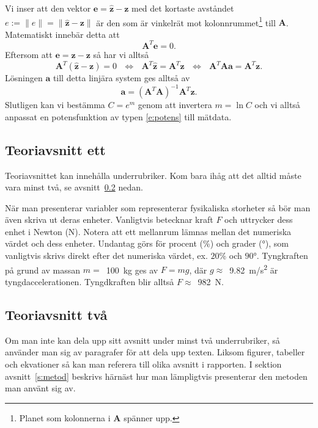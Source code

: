 \documentclass[a4paper]{article}
\begin{document}
Vi inser att den vektor $\mathbf{e}=\mathbf{\hat{z}}-\mathbf{z}$ med det kortaste avståndet $e:=\|e\|=\|\mathbf{\hat{z}}-\mathbf{z}\|$ är den som är vinkelrät mot kolonnrummet\footnote{Planet som kolonnerna i $\mathbf{A}$ spänner upp.} till $\mathbf{A}$. Matematiskt innebär detta att
%
\begin{equation}\label{e:ATe}
    \mathbf{A}^{T}\mathbf{e}=0.
\end{equation}
%
Eftersom att $\mathbf{e}=\mathbf{\hat{z}}-\mathbf{z}$ så har vi alltså
%
\begin{equation}\label{e:ATe1}
    \mathbf{A}^{T}\left(\mathbf{\hat{z}}-\mathbf{z}\right)=0
    ~~~ \Longleftrightarrow ~~~
    \mathbf{A}^{T}\mathbf{\hat{z}}=\mathbf{A}^{T}\mathbf{z}
    ~~~ \Longleftrightarrow ~~~
    \mathbf{A}^{T}\mathbf{A}\mathbf{a}=\mathbf{A}^{T}\mathbf{z}.
\end{equation}
%
Lösningen $\mathbf{a}$ till detta linjära system ges alltså av
%
\begin{equation}\label{e:a}
    \mathbf{a}=\left(\mathbf{A}^{T}\mathbf{A}\right)^{-1}\mathbf{A}^{T}\mathbf{z}.
\end{equation}
%
Slutligen kan vi bestämma $C=e^m$ genom att invertera $m=\ln C$ och vi alltså anpassat en potensfunktion av typen \eqref{e:potens} till mätdata.

\subsection{Teoriavsnitt ett}
Teoriavsnittet kan innehålla underrubriker. Kom bara ihåg att det alltid måste vara minst två, se avsnitt~\ref{s:teoriavsnitt2} nedan. 

När man presenterar variabler som representerar fysikaliska storheter så bör man även skriva ut deras enheter. Vanligtvis betecknar kraft $F$ och uttrycker dess enhet i Newton (N). Notera att ett mellanrum lämnas mellan det numeriska värdet och dess enheter. Undantag görs för procent (\%) och grader (\si{\degree}), som vanligtvis skrivs direkt efter det numeriska värdet, ex. $20$\% och $90$\si{\degree}.  Tyngkraften på grund av massan $m=$~\SI{100}{kg} ges av $F=mg$, där $g\approx$~\SI{9.82}{m/s^2} är tyngdaccelerationen. Tyngdkraften blir alltså $F\approx$~\SI{982}{N}.

\subsection{Teoriavsnitt två}\label{s:teoriavsnitt2}
Om man inte kan dela upp sitt avsnitt under minst två underrubriker, så använder man sig av paragrafer för att dela upp texten. Liksom figurer, tabeller och ekvationer så kan man referera till olika avsnitt i rapporten. I sektion avsnitt~\ref{s:metod} beskrivs härnäst hur man lämpligtvis presenterar den metoden man använt sig av.
\end{document}
